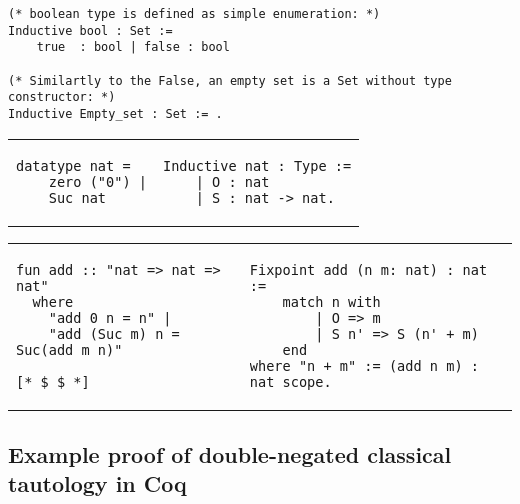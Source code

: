 \documentclass[article]{aaltoseries}
\begin{document}
\begin{lstlisting}[language=coq, 
  caption={Basic \texttt{Set} types definitions in Coq},
  label={ex_typedef_bool_coq}]
(* boolean type is defined as simple enumeration: *)
Inductive bool : Set :=
    true  : bool | false : bool

(* Similartly to the False, an empty set is a Set without type constructor: *)
Inductive Empty_set : Set := .
\end{lstlisting}


\begin{raggedleft}
\begin{tabular}{p{.48\linewidth} p{.48\linewidth}}
\begin{lstlisting}[language=isabelle, caption={Definition of Peano's natural numbers type \texttt{nat} in Isabelle}, label={ex_nat_definition_isabelle}]
datatype nat = 
    zero ("0") |
    Suc nat
\end{lstlisting}
&
\begin{lstlisting}[language=coq, caption={Definition of Peano's natural numbers type \texttt{nat} in Coq}, label={ex_nat_definition_coq}]
Inductive nat : Type :=
    | O : nat
    | S : nat -> nat.
\end{lstlisting}
\end{tabular}
\end{raggedleft}


\begin{raggedleft}
  \begin{tabular}{p{.48\linewidth} p{.48\linewidth}}
    \begin{lstlisting}[language=isabelle, caption={Definition of addition over \texttt{nat} in Isabelle}]
fun add :: "nat => nat => nat"
  where
    "add 0 n = n" |
    "add (Suc m) n = Suc(add m n)"

[* $ $ *]
    \end{lstlisting}
    &
    \begin{lstlisting}[language=coq, caption={Definition of addition over \texttt{nat} in Coq}]
Fixpoint add (n m: nat) : nat :=
    match n with
        | O => m
        | S n' => S (n' + m)
    end
where "n + m" := (add n m) : nat_scope.
    \end{lstlisting}
  \end{tabular}
\end{raggedleft}


\newpage
\subsection{Example proof of double-negated classical tautology in Coq}
\label{apx:double_negated}
\end{document}
